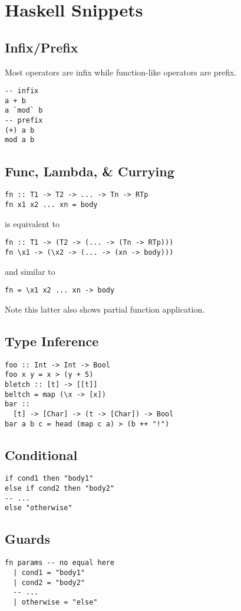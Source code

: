 \section{Haskell Snippets}
\subsection*{Infix/Prefix}
Most operators are infix while function-like operators are prefix.
\begin{verbatim}
-- infix
a + b
a `mod` b
-- prefix
(+) a b
mod a b
\end{verbatim}

\subsection*{Func, Lambda, \& Currying}
\begin{verbatim}
fn :: T1 -> T2 -> ... -> Tn -> RTp
fn x1 x2 ... xn = body
\end{verbatim}
is equivalent to
\begin{verbatim}
fn :: T1 -> (T2 -> (... -> (Tn -> RTp)))
fn \x1 -> (\x2 -> (... -> (xn -> body)))
\end{verbatim}
and similar to
\begin{verbatim}
fn = \x1 x2 ... xn -> body
\end{verbatim}
Note this latter also shows partial function application.

\subsection*{Type Inference}
\begin{verbatim}
foo :: Int -> Int -> Bool
foo x y = x > (y + 5)
bletch :: [t] -> [[t]]
beltch = map (\x -> [x])
bar ::
  [t] -> [Char] -> (t -> [Char]) -> Bool
bar a b c = head (map c a) > (b ++ "!")
\end{verbatim}

\subsection*{Conditional}
\begin{verbatim}
if cond1 then "body1"
else if cond2 then "body2"
-- ...
else "otherwise"
\end{verbatim}

\subsection*{Guards}
\begin{verbatim}
fn params -- no equal here
  | cond1 = "body1"
  | cond2 = "body2"
  -- ...
  | otherwise = "else"
\end{verbatim}

